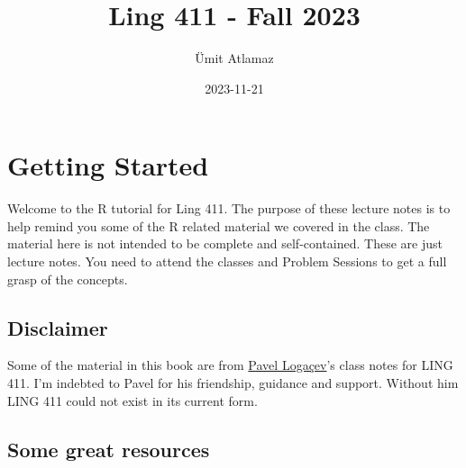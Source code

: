 \documentclass[
]{book}
\title{Ling 411 - Fall 2023}
\author{Ümit Atlamaz}
\date{2023-11-21}
\newenvironment{Shaded}{\begin{snugshade}}{\end{snugshade}}
\newcommand{\AttributeTok}[1]{\textcolor[rgb]{0.13,0.29,0.53}{#1}}
\newcommand{\CommentTok}[1]{\textcolor[rgb]{0.56,0.35,0.01}{\textit{#1}}}
\newcommand{\DecValTok}[1]{\textcolor[rgb]{0.00,0.00,0.81}{#1}}
\newcommand{\FunctionTok}[1]{\textcolor[rgb]{0.13,0.29,0.53}{\textbf{#1}}}
\newcommand{\NormalTok}[1]{#1}
\newcommand{\SpecialCharTok}[1]{\textcolor[rgb]{0.81,0.36,0.00}{\textbf{#1}}}
\newcommand{\StringTok}[1]{\textcolor[rgb]{0.31,0.60,0.02}{#1}}
\begin{document}
\maketitle

{
\setcounter{tocdepth}{1}
\tableofcontents
}
\begin{Shaded}
\end{Shaded}

\hypertarget{getting-started}{%
\chapter{Getting Started}\label{getting-started}}

Welcome to the R tutorial for Ling 411. The purpose of these lecture notes is to help remind you some of the R related material we covered in the class. The material here is not intended to be complete and self-contained. These are just lecture notes. You need to attend the classes and Problem Sessions to get a full grasp of the concepts.

\hypertarget{disclaimer}{%
\section{Disclaimer}\label{disclaimer}}

Some of the material in this book are from \href{https://scholar.google.com/citations?user=fhbdTJIAAAAJ\&hl=tr}{Pavel Logaçev}'s class notes for LING 411. I'm indebted to Pavel for his friendship, guidance and support. Without him LING 411 could not exist in its current form.

\hypertarget{some-great-resources}{%
\section{Some great resources}\label{some-great-resources}}
\end{document}
